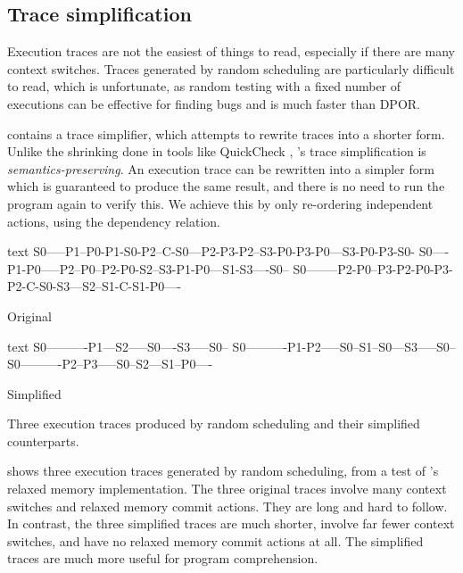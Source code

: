 \subsection{Trace simplification}

Execution traces are not the easiest of things to read, especially if
there are many context switches.  Traces generated by random
scheduling are particularly difficult to read, which is unfortunate,
as random testing with a fixed number of executions can be effective
for finding bugs and is much faster than DPOR.

\dejafu{} contains a trace simplifier, which attempts to rewrite
traces into a shorter form.  Unlike the shrinking done in tools like
QuickCheck \parencite{claessen2000}, \dejafu{}'s trace simplification is
\emph{semantics-preserving}.  An execution trace can be rewritten into
a simpler form which is guaranteed to produce the same result, and
there is no need to run the program again to verify this.  We achieve
this by only re-ordering independent actions, using the dependency
relation.

\begin{listing}
\begin{sublisting}{\textwidth}
\centering
\begin{cminted}{text}
S0-----P1--P0-P1-S0-P2--C-S0---P2-P3-P2--S3-P0-P3-P0---S3-P0-P3-S0-
S0----P1-P0-----P2--P0--P2-P0-S2--S3-P1-P0---S1-S3----S0--
S0--------P2-P0--P3-P2-P0-P3-P2-C-S0-S3---S2--S1-C-S1-P0----
\end{cminted}
\caption{Original}\label{lst:trace_simplification_orig}
\end{sublisting}

\vspace{1.5em}

\begin{sublisting}{\textwidth}
\centering
\begin{cminted}{text}
S0----------P1---S2-----S0----S3-----S0--
S0----------P1-P2-----S0--S1--S0---S3-----S0--
S0----------P2--P3-----S0--S2---S1--P0----
\end{cminted}
\caption{Simplified}\label{lst:trace_simplification_simplified}
\end{sublisting}
\caption[The effect of trace simplification.]{Three execution traces produced by random scheduling and their simplified counterparts.}\label{lst:trace_simplification}
\end{listing}

 shows three execution traces generated
by random scheduling, from a test of \dejafu{}'s relaxed memory
implementation.  The three original traces involve many context
switches and relaxed memory commit actions.  They are long and hard to
follow.  In contrast, the three simplified traces are much shorter,
involve far fewer context switches, and have no relaxed memory commit
actions at all.  The simplified traces are much more useful for
program comprehension.

